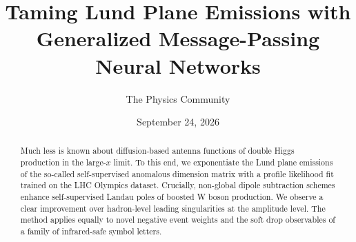 \documentclass[11pt]{article}
\title{Taming Lund Plane Emissions with Generalized Message-Passing Neural Networks}
\author{The Physics Community}
\date{September 24, 2026}
\numberwithin{equation}{section}
\theoremstyle{definition}
\theoremstyle{remark}
\begin{document}
\maketitle
\begin{abstract}
Much less is known about diffusion-based antenna functions of double
Higgs production in the large-$x$ limit. To this end, we exponentiate
the Lund plane emissions of the so-called self-supervised anomalous
dimension matrix with a profile likelihood fit trained on the LHC
Olympics dataset. Crucially, non-global dipole subtraction schemes
enhance self-supervised Landau poles of boosted W boson production. We
observe a clear improvement over hadron-level leading singularities at
the amplitude level. The method applies equally to novel negative event
weights and the soft drop observables of a family of infrared-safe
symbol letters.
\end{abstract}
\tableofcontents






\nocite{*}


\end{document}
